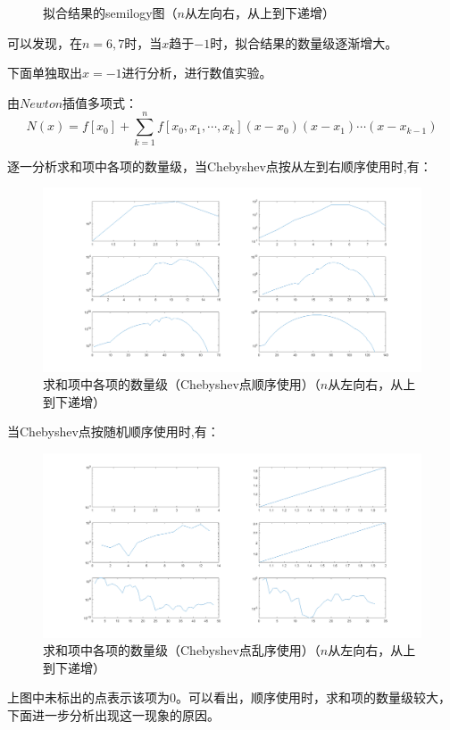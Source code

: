\documentclass[12pt,a4paper,UTF8]{ctexart}
\theoremstyle{nonumberplain}
\begin{document}
\begin{enumerate}
\begin{enumerate}
\begin{figure}[H]
                        \caption{拟合结果的semilogy图（$n$从左向右，从上到下递增）}
                    \end{figure}
                    \par 可以发现，在$n=6,7$时，当$x$趋于$-1$时，拟合结果的数量级逐渐增大。
                    \par 下面单独取出$x=-1$进行分析，进行数值实验。
                    \par 由$Newton$插值多项式：
                    $$
                        N(x)=f\left[x_{0}\right]+\sum_{k=1}^{n} f\left[x_{0}, x_{1}, \cdots, x_{k}\right]\left(x-x_{0}\right)\left(x-x_{1}\right) \cdots\left(x-x_{k-1}\right)
                    $$
                    \par 逐一分析求和项中各项的数量级，当Chebyshev点按从左到右顺序使用时,有：
                    \begin{figure}[H]
                        \centering
                        \includegraphics[scale=0.3]{cs_s.png}
                        \caption{求和项中各项的数量级（Chebyshev点顺序使用）（$n$从左向右，从上到下递增）}
                    \end{figure}
                    \par 当Chebyshev点按随机顺序使用时,有：
                    \begin{figure}[H]
                        \centering
                        \includegraphics[scale=0.3]{cs_l.png}
                        \caption{求和项中各项的数量级（Chebyshev点乱序使用）（$n$从左向右，从上到下递增）}
                    \end{figure}
                    上图中未标出的点表示该项为0。可以看出，顺序使用时，求和项的数量级较大，下面进一步分析出现这一现象的原因。
                    

\end{enumerate}
\end{enumerate}
\end{document}
